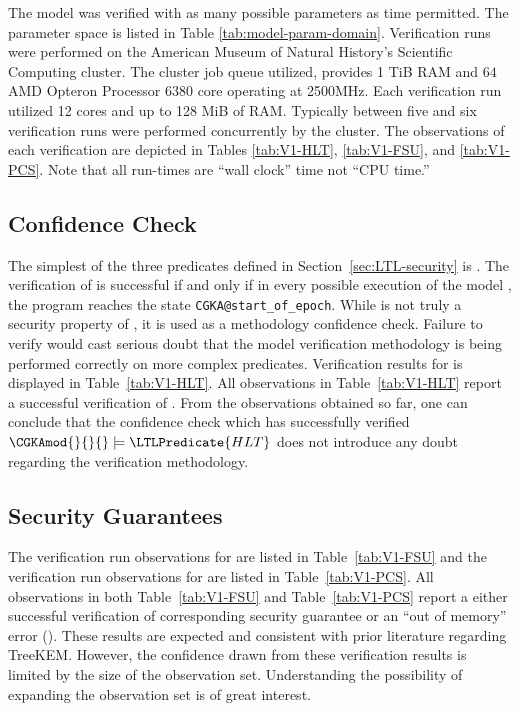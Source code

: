 The model  was verified with as many possible parameters as time permitted.
The parameter space is listed in  Table \ref{tab:model-param-domain}.
Verification runs were performed on the American Museum of Natural History's Scientific Computing cluster.
The cluster job queue utilized, provides 1 TiB RAM and \(64\) AMD Opteron Processor 6380 core operating at 2500MHz.
Each verification run utilized 12 cores and up to 128 MiB of RAM.
Typically between five and six verification runs were performed concurrently by the cluster.
The observations of each  verification are depicted in Tables \ref{tab:V1-HLT}, \ref{tab:V1-FSU}, and \ref{tab:V1-PCS}.
Note that all run-times are ``wall clock'' time not ``CPU time.''

\hypertarget{sec:confidence-check}{%
\subsection{Confidence Check}\label{sec:confidence-check}}

The simplest of the three  predicates defined in Section\ \ref{sec:LTL-security} is .
The verification of  is successful if and only if in every possible execution of the model \CGKAmod{}{}{}, the program reaches the state \texttt{CGKA@start\_of\_epoch}.
While  is not truly a security property of \CGKAmod{}{}{}, it is used as a methodology confidence check.
Failure to verify  would cast serious doubt that the model verification methodology is being performed correctly on more complex  predicates.
Verification results for  is displayed in Table\ \ref{tab:V1-HLT}.
All observations in Table\ \ref{tab:V1-HLT} report a successful verification of .
From the observations obtained so far, one can conclude that the confidence check which has successfully verified \( \CGKAmod{}{}{} \models \LTLPredicate{HLT} \) does not introduce any doubt regarding the verification methodology.


\hypertarget{sec:post-compromise-security-results}{%
\subsection{Security Guarantees}\label{sec:post-compromise-security-results}}

The verification run observations for  are listed in Table\ \ref{tab:V1-FSU} and the verification run observations for  are listed in Table\ \ref{tab:V1-PCS}.
All observations in both Table\ \ref{tab:V1-FSU} and Table\ \ref{tab:V1-PCS} report a either successful verification of corresponding security guarantee or an ``out of memory'' error (\OutOfMemory).
These results are expected and consistent with prior literature regarding TreeKEM.
However, the confidence drawn from these verification results is limited by the size of the observation set.
Understanding the possibility of expanding the observation set is of great interest.


